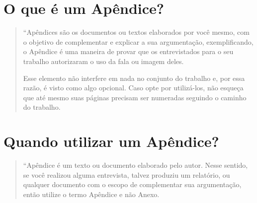 \begin{apendicesenv}

\partapendices

\chapter{O que é um Apêndice?}
\begin{quote}\small
``Apêndices são os documentos ou textos elaborados por você mesmo, com o objetivo de complementar e explicar a sua argumentação, exemplificando, o Apêndice é uma maneira de provar que os entrevistados para o seu trabalho autorizaram o uso da fala ou imagem deles.

Esse elemento não interfere em nada no conjunto do trabalho e, por essa razão, é visto como algo opcional. Caso opte por utilizá-los, não esqueça que até mesmo suas páginas precisam ser numeradas seguindo o caminho do trabalho.
\cite{guia}
\end{quote}

\chapter{Quando utilizar um Apêndice?}
\begin{quote}\small
``Apêndice é um texto ou documento elaborado pelo autor. Nesse sentido, se você realizou alguma entrevista, talvez produziu um relatório, ou qualquer documento com o escopo de complementar sua argumentação, então utilize o termo Apêndice e não Anexo.
\cite{guia}
\end{quote}

\end{apendicesenv}